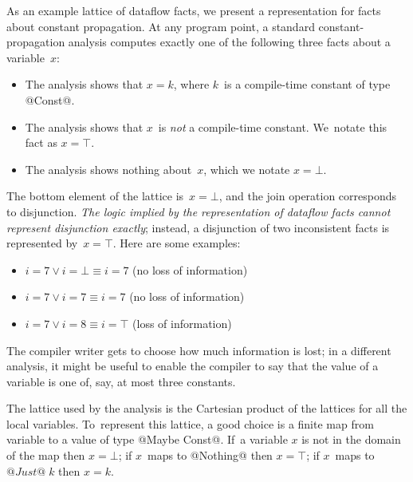 \documentclass[blockstyle,preprint,nocopyrightspace]{sigplanconf}
\newcommand{\authornote}[1]{{\em #1}}
\def\authornote#1{\unskip\relax}
\newcommand{\simon}[1]{\authornote{SLPJ: #1}}
\newcommand{\norman}[1]{\authornote{NR: #1}}
\let\remark\norman
\begin{document}
As an example lattice of dataflow facts, 
we present a representation for facts about constant propagation.
At any program point, a standard constant-propagation analysis
computes exactly one of the following three
facts about a variable~$x$:
\remark{We're a bit careless about distinguishing
 ``fact'' and ``assertion'', but the general idea is that an
 ``assertion'' is God's truth in logic and a ``fact'' is an
 approximation or representation of an assertion.
Perhaps future revisions will clarify.}
\begin{itemize}
\item
The analysis shows that
$x = k$, where $k$~is a compile-time constant of type @Const@.
\item
The analysis shows that $x$~is \emph{not} a compile-time constant.
We~notate this fact as $x = \top$.
\item
The analysis shows nothing about~$x$, which we notate $x=\bot$.
\end{itemize}
The bottom element of the lattice is~$x=\bot$, and
the join operation corresponds to disjunction.
\emph{The logic implied by the
representation of dataflow facts cannot represent disjunction
exactly}; instead, a
disjunction of two inconsistent facts is represented by~$x=\top$.
Here are some examples:
\begin{itemize}
\item
$i = 7 \lor i=\bot \equiv i=7$ (no loss of information)
\item
$i = 7 \lor i= 7 \equiv  i=7$ (no loss of information)
\item
$i = 7 \lor i = 8 \equiv i = \top$ (loss of information)
\end{itemize}
The compiler writer gets to choose how much information is lost;
in a different analysis, it might be useful to 
\ifpagetuning{\vadjust{\break}}\fi
enable the compiler to say
that the value of a variable is one of,
say, at most three constants.
\remark{This sentence is here to make Simon
happy; if it does not do its job, out it goes!}
\simon{What is ``the compiler''?  The library or the client?
Also the ``the logic implied by the representation of the dataflow facts cannot represent
disjunction''.  So we have the compiler, the logic, and the representation all swirling
about in my head.  I don't think we can fix my problem by a few words here; so out it goes.}

The lattice  used by the analysis is the Cartesian product of the
lattices for all the local variables.
To~represent this lattice, a good choice is a finite map from variable
to a value of type @Maybe Const@.
If~a variable $x$ is not in the domain of the map then $x=\bot$;
if $x$~maps to @Nothing@ then $x=\top$; if $x$~maps to $@Just@\;k$ then
$x=k$.
\end{document}

